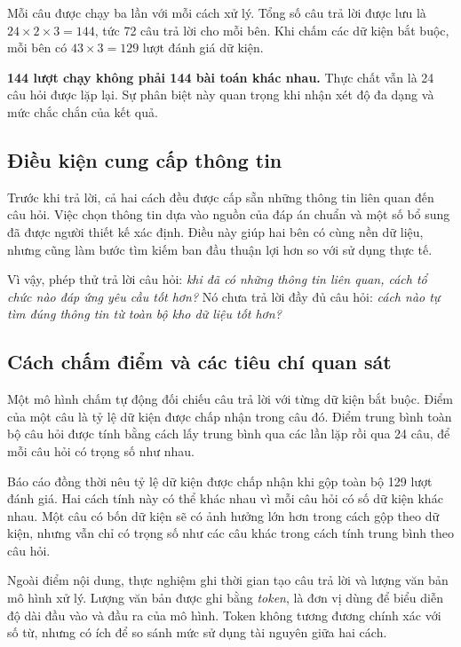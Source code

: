 Mỗi câu được chạy ba lần với mỗi cách xử lý. Tổng số câu trả lời được lưu là $24\times2\times3=144$, tức 72 câu trả lời cho mỗi bên. Khi chấm các dữ kiện bắt buộc, mỗi bên có $43\times3=129$ lượt đánh giá dữ kiện.

\textbf{144 lượt chạy không phải 144 bài toán khác nhau.} Thực chất vẫn là 24 câu hỏi được lặp lại. Sự phân biệt này quan trọng khi nhận xét độ đa dạng và mức chắc chắn của kết quả.

\subsection{Điều kiện cung cấp thông tin}
Trước khi trả lời, cả hai cách đều được cấp sẵn những thông tin liên quan đến câu hỏi. Việc chọn thông tin dựa vào nguồn của đáp án chuẩn và một số bổ sung đã được người thiết kế xác định. Điều này giúp hai bên có cùng nền dữ liệu, nhưng cũng làm bước tìm kiếm ban đầu thuận lợi hơn so với sử dụng thực tế. 

Vì vậy, phép thử trả lời câu hỏi: \textit{khi đã có những thông tin liên quan, cách tổ chức nào đáp ứng yêu cầu tốt hơn?} Nó chưa trả lời đầy đủ câu hỏi: \textit{cách nào tự tìm đúng thông tin từ toàn bộ kho dữ liệu tốt hơn?}


\subsection{Cách chấm điểm và các tiêu chí quan sát}
Một mô hình chấm tự động đối chiếu câu trả lời với từng dữ kiện bắt buộc. Điểm của một câu là tỷ lệ dữ kiện được chấp nhận trong câu đó. Điểm trung bình toàn bộ câu hỏi được tính bằng cách lấy trung bình qua các lần lặp rồi qua 24 câu, để mỗi câu hỏi có trọng số như nhau. 

Báo cáo đồng thời nêu tỷ lệ dữ kiện được chấp nhận khi gộp toàn bộ 129 lượt đánh giá. Hai cách tính này có thể khác nhau vì mỗi câu hỏi có số dữ kiện khác nhau. Một câu có bốn dữ kiện sẽ có ảnh hưởng lớn hơn trong cách gộp theo dữ kiện, nhưng vẫn chỉ có trọng số như các câu khác trong cách tính trung bình theo câu hỏi.

Ngoài điểm nội dung, thực nghiệm ghi thời gian tạo câu trả lời và lượng văn bản mô hình xử lý. Lượng văn bản được ghi bằng \textit{token}, là đơn vị dùng để biểu diễn độ dài đầu vào và đầu ra của mô hình. Token không tương đương chính xác với số từ, nhưng có ích để so sánh mức sử dụng tài nguyên giữa hai cách.

